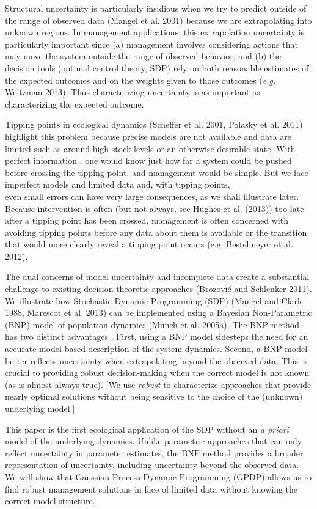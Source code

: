 \documentclass[author-year, 12pt,review]{components/elsarticle} %
\begin{document}
Structural uncertainty is particularly insidious when we try to predict
outside of the range of observed data (Mangel et al. 2001) because we
are extrapolating into unknown regions. In management applications, this
extrapolation uncertainty is particularly important since (a) management
involves considering actions that may move the system outside the range
of observed behavior, and (b) the decision tools (optimal control
theory, SDP) rely on both reasonable estimates of the expected outcomes
and on the weights given to those outcomes (\emph{e.g.} Weitzman 2013).
Thus characterizing uncertainty is as important as characterizing the
expected outcome.

Tipping points in ecological dynamics (Scheffer et al. 2001, Polasky et
al. 2011) highlight this problem because precise models are not
available and data are limited such as around high stock levels or an
otherwise desirable state. With perfect information , one would know
just how far a system could be pushed before crossing the tipping point,
and management would be simple. But we face imperfect models and limited
data and, with tipping points,\\even small errors can have very large
consequences, as we shall illustrate later. Because intervention is
often (but not always, see Hughes et al. (2013)) too late after a
tipping point has been crossed, management is often concerned with
avoiding tipping points before any data about them is available or the
transition that would more clearly reveal a tipping point occurs (e.g.
Bestelmeyer et al. 2012).

The dual concerns of model uncertainty and incomplete data create a
substantial challenge to existing decision-theoretic approaches
(Brozović and Schlenker 2011). We illustrate how Stochastic Dynamic
Programming (SDP) (Mangel and Clark 1988, Marescot et al. 2013) can be
implemented using a Bayesian Non-Parametric (BNP) model of population
dynamics (Munch et al. 2005a). The BNP method has two distinct
advantages . First, using a BNP model sidesteps the need for an accurate
model-based description of the system dynamics. Second, a BNP model
better reflects uncertainty when extrapolating beyond the observed data.
This is crucial to providing robust decision-making when the correct
model is not known (as is almost always true). {[}We use \emph{robust}
to characterize approaches that provide nearly optimal solutions without
being sensitive to the choice of the (unknown) underlying model.{]}

This paper is the first ecological application of the SDP without an
\emph{a priori} model of the underlying dynamics. Unlike parametric
approaches that can only reflect uncertainty in parameter estimates, the
BNP method provides a broader representation of uncertainty, including
uncertainty beyond the observed data. We will show that Gaussian Process
Dynamic Programming (GPDP) allows us to find robust management solutions
in face of limited data without knowing the correct model structure.
\end{document}
